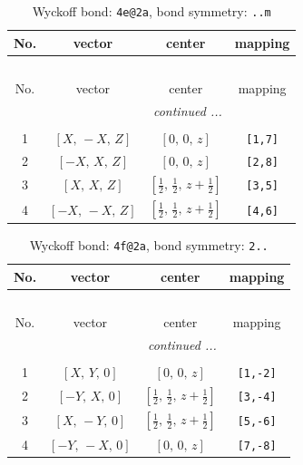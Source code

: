 \documentclass[fleqn,8pt]{jsarticle}
\begin{document}
\renewcommand{\arraystretch}{1.2}
\begin{longtable}{cccc}
\caption{Wyckoff bond: {\tt 4e@2a}, bond symmetry: {\tt ..m}}
 \\
 \hline \hline
No. & vector & center & mapping \\ \hline \endfirsthead

\multicolumn{3}{l}{\tablename\ \thetable{}} \\
 \hline \hline
No. & vector & center & mapping \\ \hline \endhead

 \hline \hline
\multicolumn{3}{r}{\footnotesize\it continued ...} \\ \endfoot

 \hline \hline
\multicolumn{3}{r}{} \\ \endlastfoot

1 & $\left[ X,\, - X,\, Z \right]$ & $\left[ 0,\, 0,\, z \right]$ & {\tt [1,7]} \\ \hline
2 & $\left[ - X,\, X,\, Z \right]$ & $\left[ 0,\, 0,\, z \right]$ & {\tt [2,8]} \\ \hline
3 & $\left[ X,\, X,\, Z \right]$ & $\left[ \frac{1}{2},\, \frac{1}{2},\, z + \frac{1}{2} \right]$ & {\tt [3,5]} \\ \hline
4 & $\left[ - X,\, - X,\, Z \right]$ & $\left[ \frac{1}{2},\, \frac{1}{2},\, z + \frac{1}{2} \right]$ & {\tt [4,6]} \\
\end{longtable}
\renewcommand{\arraystretch}{1.2}
\begin{longtable}{cccc}
\caption{Wyckoff bond: {\tt 4f@2a}, bond symmetry: {\tt 2..}}
 \\
 \hline \hline
No. & vector & center & mapping \\ \hline \endfirsthead

\multicolumn{3}{l}{\tablename\ \thetable{}} \\
 \hline \hline
No. & vector & center & mapping \\ \hline \endhead

 \hline \hline
\multicolumn{3}{r}{\footnotesize\it continued ...} \\ \endfoot

 \hline \hline
\multicolumn{3}{r}{} \\ \endlastfoot

1 & $\left[ X,\, Y,\, 0 \right]$ & $\left[ 0,\, 0,\, z \right]$ & {\tt [1,-2]} \\ \hline
2 & $\left[ - Y,\, X,\, 0 \right]$ & $\left[ \frac{1}{2},\, \frac{1}{2},\, z + \frac{1}{2} \right]$ & {\tt [3,-4]} \\ \hline
3 & $\left[ X,\, - Y,\, 0 \right]$ & $\left[ \frac{1}{2},\, \frac{1}{2},\, z + \frac{1}{2} \right]$ & {\tt [5,-6]} \\ \hline
4 & $\left[ - Y,\, - X,\, 0 \right]$ & $\left[ 0,\, 0,\, z \right]$ & {\tt [7,-8]} \\
\end{longtable}
\end{document}
